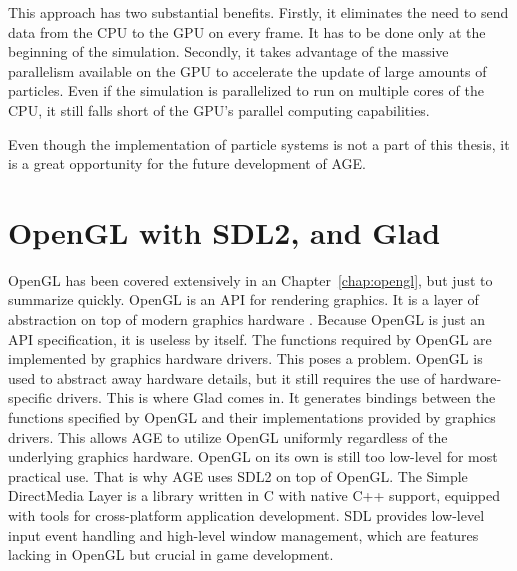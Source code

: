 \documentclass[
  digital,     %
  oneside,     %
  nosansbold,  %
  nocolorbold, %
  lof,         %
  lot,         %
]{fithesis4}
\begin{document}
This approach has two substantial benefits. Firstly, it eliminates the need to send data from the CPU to the GPU
on every frame. It has to be done only at the beginning of the simulation. Secondly, it takes advantage of the
massive parallelism available on the GPU to accelerate the update of large amounts of particles. Even if the simulation
is parallelized to run on multiple cores of the CPU, it still falls short of the GPU's parallel computing capabilities.

Even though the implementation of particle systems is not a part of this thesis,
it is a great opportunity for the future development of AGE.

\chapter{OpenGL with SDL2, and Glad}\label{app:sdl-glad}
OpenGL has been covered extensively in an Chapter~\ref{chap:opengl}, but just to summarize quickly. OpenGL is an
API for rendering graphics. It is a layer of abstraction on top of modern graphics hardware \cite{khronos}.
Because OpenGL is just an API specification, it is useless by itself.
The functions required by OpenGL are implemented by graphics hardware drivers. This poses a problem.
OpenGL is used to abstract away hardware details, but it still requires the use of hardware-specific drivers.
This is where Glad \cite{glad} comes in. It generates bindings between the functions specified by OpenGL
and their implementations provided by graphics drivers. This allows AGE to utilize OpenGL uniformly
regardless of the underlying graphics hardware. OpenGL on its own is still too low-level
for most practical use. That is why AGE uses SDL2 on top of OpenGL. The Simple DirectMedia Layer \cite{sdl}
is a library written in C with native C++ support, equipped with tools for cross-platform application
development. SDL provides low-level input event handling and high-level window management, which are features lacking in OpenGL
but crucial in game development.
\end{document}
